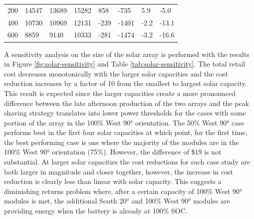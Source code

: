 \documentclass[journal,article,submit,pdftex,moreauthors]{Definitions/mdpi}
\begin{document}
\begin{table}[!h]
\begin{tabularx}{\textwidth}{XXXXXXXX}
    200             & 14547                 & 13689                     & 15282                      & 858                                 & -735                                 & 5.9                                 & -5.0                                 \\
    400             & 10730                 & 10969                     & 12131                      & -239                                & -1401                                & -2.2                                & -13.1                                \\
    600             & 8859                  & 9140                      & 10333                      & -281                                & -1474                                & -3.2                                & -16.6                                \\
    \bottomrule
  \end{tabularx}
\end{table}

A sensitivity analysis on the size of the solar array is performed with the results in Figure \ref{fig:solar-sensitivity} and Table \ref{tab:solar-sensitivity}. The total retail cost decreases monotonically with the larger solar capacities and the cost reduction increases by a factor of 10 from the smallest to largest solar capacity. This result is expected since the larger capacities create a more pronounced difference between the late afternoon production of the two arrays and the peak shaving strategy translates into lower power thresholds for the cases with some portion of the array in the 100\% West 90° orientation. The 50\% West 90° case performs best in the first four solar capacities at which point, for the first time, the best performing case is one where the majority of the modules are in the 100\% West 90° orientation (75\%). However, the difference of \$19 is not substantial. At larger solar capacities the cost reductions for each case study are both larger in magnitude and closer together, however, the increase in cost reduction is clearly less than linear with solar capacity. This suggests a diminishing returns problem where, after a certain capacity of 100\% West 90° modules is met, the additional South 20° and 100\% West 90° modules are providing energy when the battery is already at 100\% SOC.
\end{document}
